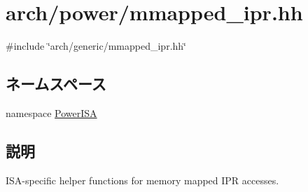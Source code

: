 \hypertarget{power_2mmapped__ipr_8hh}{
\section{arch/power/mmapped\_\-ipr.hh}
\label{power_2mmapped__ipr_8hh}
}
{\ttfamily \#include \char`\"{}arch/generic/mmapped\_\-ipr.hh\char`\"{}}\par
\subsection*{ネームスペース}
\begin{DoxyCompactItemize}
\item 
namespace \hyperlink{namespacePowerISA}{PowerISA}
\end{DoxyCompactItemize}


\subsection{説明}
ISA-\/specific helper functions for memory mapped IPR accesses. 